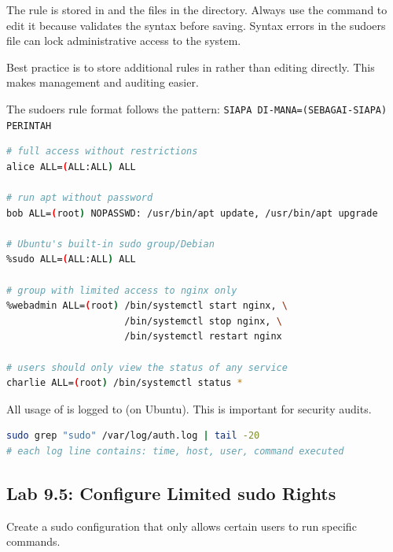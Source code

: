 The rule  is stored in  and the files in the  directory. Always use the  command to edit it because  validates the syntax before saving. Syntax errors in the sudoers file can lock administrative access to the system.

Best practice is to store additional rules in  rather than editing  directly. This makes management and auditing easier.

The sudoers rule format follows the pattern: \texttt{SIAPA DI-MANA=(SEBAGAI-SIAPA) PERINTAH}

\begin{lstlisting}[language=bash, caption={Example of a representative sudoers rule}]
# full access without restrictions
alice ALL=(ALL:ALL) ALL

# run apt without password
bob ALL=(root) NOPASSWD: /usr/bin/apt update, /usr/bin/apt upgrade

# Ubuntu's built-in sudo group/Debian
%sudo ALL=(ALL:ALL) ALL

# group with limited access to nginx only
%webadmin ALL=(root) /bin/systemctl start nginx, \
                     /bin/systemctl stop nginx, \
                     /bin/systemctl restart nginx

# users should only view the status of any service
charlie ALL=(root) /bin/systemctl status *
\end{lstlisting}

All usage of  is logged to  (on Ubuntu). This is important for security audits.

\begin{lstlisting}[language=bash, caption={Reading sudo logs}]
sudo grep "sudo" /var/log/auth.log | tail -20
# each log line contains: time, host, user, command executed
\end{lstlisting}

\subsection*{Lab 9.5: Configure Limited sudo Rights}

Create a sudo configuration that only allows certain users to run specific commands.

